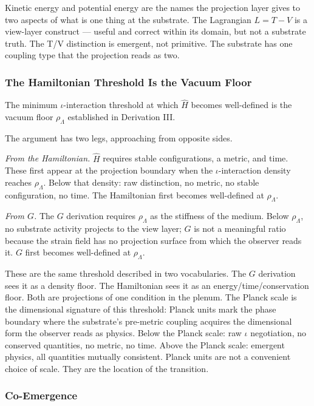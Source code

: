 \documentclass[11pt,letterpaper]{article}
\begin{document}
Kinetic energy and potential energy are the names the projection layer gives to two aspects of what is one thing at the substrate. The Lagrangian \(L = T - V\) is a view-layer construct --- useful and correct within its domain, but not a substrate truth. The T/V distinction is emergent, not primitive. The substrate has one coupling type that the projection reads as two.

\subsubsection{The Hamiltonian Threshold Is the Vacuum Floor}
\label{sec:orgc44d910}

The minimum \(\iota\)-interaction threshold at which \(\hat{H}\) becomes well-defined is the vacuum floor \(\rho_\Lambda\) established in Derivation III.

The argument has two legs, approaching from opposite sides.

\emph{From the Hamiltonian.} \(\hat{H}\) requires stable configurations, a metric, and time. These first appear at the projection boundary when the \(\iota\)-interaction density reaches \(\rho_\Lambda\). Below that density: raw distinction, no metric, no stable configuration, no time. The Hamiltonian first becomes well-defined at \(\rho_\Lambda\).

\emph{From \(G\).} The \(G\) derivation requires \(\rho_\Lambda\) as the stiffness of the medium. Below \(\rho_\Lambda\), no substrate activity projects to the view layer; \(G\) is not a meaningful ratio because the strain field has no projection surface from which the observer reads it. \(G\) first becomes well-defined at \(\rho_\Lambda\).

These are the same threshold described in two vocabularies. The \(G\) derivation sees it as a density floor. The Hamiltonian sees it as an energy/time/conservation floor. Both are projections of one condition in the plenum. The Planck scale is the dimensional signature of this threshold: Planck units mark the phase boundary where the substrate's pre-metric coupling acquires the dimensional form the observer reads as physics. Below the Planck scale: raw \(\iota\) negotiation, no conserved quantities, no metric, no time. Above the Planck scale: emergent physics, all quantities mutually consistent. Planck units are not a convenient choice of scale. They are the location of the transition.

\subsubsection{Co-Emergence}
\label{sec:org923990e}
\end{document}
